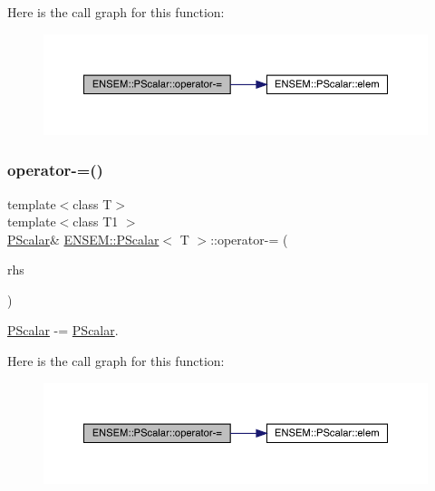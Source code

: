 Here is the call graph for this function\+:
\nopagebreak
\begin{figure}[H]
\begin{center}
\leavevmode
\includegraphics[width=350pt]{d3/d27/classENSEM_1_1PScalar_a8c0e633dbd87bcb922496bfaf136752c_cgraph}
\end{center}
\end{figure}
\mbox{\label{classENSEM_1_1PScalar_a8c0e633dbd87bcb922496bfaf136752c}} 
\subsubsection{\texorpdfstring{operator-\/=()}{operator-=()}\hspace{0.1cm}{\footnotesize\ttfamily [2/3]}}
{\footnotesize\ttfamily template$<$class T$>$ \\
template$<$class T1 $>$ \\
\mbox{\hyperlink{classENSEM_1_1PScalar}{P\+Scalar}}\& \mbox{\hyperlink{classENSEM_1_1PScalar}{E\+N\+S\+E\+M\+::\+P\+Scalar}}$<$ T $>$\+::operator-\/= (\begin{DoxyParamCaption}\item[{const \mbox{\hyperlink{classENSEM_1_1PScalar}{P\+Scalar}}$<$ T1 $>$ \&}]{rhs }\end{DoxyParamCaption})\hspace{0.3cm}{\ttfamily [inline]}}



\mbox{\hyperlink{classENSEM_1_1PScalar}{P\+Scalar}} -\/= \mbox{\hyperlink{classENSEM_1_1PScalar}{P\+Scalar}}. 

Here is the call graph for this function\+:
\nopagebreak
\begin{figure}[H]
\begin{center}
\leavevmode
\includegraphics[width=350pt]{d3/d27/classENSEM_1_1PScalar_a8c0e633dbd87bcb922496bfaf136752c_cgraph}
\end{center}
\end{figure}
\mbox{\label{classENSEM_1_1PScalar_a8c0e633dbd87bcb922496bfaf136752c}} 
